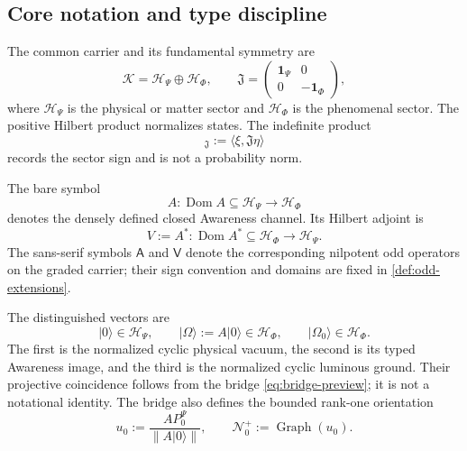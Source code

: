 \documentclass[11pt,reqno]{scrartcl}
\newcommand{\scrK}{\mathscr K}
\newcommand{\scrHP}{\mathscr H_{\Psi}}
\newcommand{\scrHF}{\mathscr H_{\Phi}}
\newcommand{\fundJ}{\mathfrak J}
\newcommand{\idop}{\mathbf 1}
\newcommand{\Aodd}{\mathsf A}
\newcommand{\Vodd}{\mathsf V}
\newcommand{\ket}[1]{\lvert #1\rangle}
\newcommand{\inner}[2]{\langle #1,#2\rangle}
\newcommand{\kInner}[2]{[#1,#2]_{\fundJ}}
\DeclareMathOperator{\Dom}{Dom}
\DeclareMathOperator{\Graph}{Graph}
\theoremstyle{plain}
\theoremstyle{definition}
\theoremstyle{remark}
\begin{document}
\subsection{Core notation and type discipline}

The common carrier and its fundamental symmetry are
\begin{equation}
  \scrK=\scrHP\oplus\scrHF,
  \qquad
  \fundJ=\begin{pmatrix}\idop_{\Psi}&0\\0&-\idop_{\Phi}\end{pmatrix},
  \label{eq:carrier-charter}
\end{equation}
where \(\scrHP\) is the physical or matter sector and \(\scrHF\) is the
phenomenal sector.  The positive Hilbert product normalizes states.  The
indefinite product
\begin{equation}
  \kInner{\xi}{\eta}:=\inner{\xi}{\fundJ\eta}
\end{equation}
records the sector sign and is not a probability norm.

The bare symbol
\begin{equation}
  A:\Dom A\subseteq\scrHP\longrightarrow\scrHF
  \label{eq:typed-A-charter}
\end{equation}
denotes the densely defined closed Awareness channel.  Its Hilbert adjoint is
\begin{equation}
  V:=A^*:\Dom A^*\subseteq\scrHF\longrightarrow\scrHP.
  \label{eq:typed-V-charter}
\end{equation}
The sans-serif symbols \(\Aodd\) and \(\Vodd\) denote the corresponding
nilpotent odd operators on the graded carrier; their sign convention and
domains are fixed in \cref{def:odd-extensions}.

The distinguished vectors are
\begin{equation}
  \ket0\in\scrHP,
  \qquad
  \ket\Omega:=A\ket0\in\scrHF,
  \qquad
  \ket{\Omega_0}\in\scrHF.
  \label{eq:ground-charter}
\end{equation}
The first is the normalized cyclic physical vacuum, the second is its typed
Awareness image, and the third is the normalized cyclic luminous ground.
Their projective coincidence follows from the bridge
\eqref{eq:bridge-preview}; it is not a notational identity.  The bridge also
defines the bounded rank-one orientation
\begin{equation}
  u_0:=\frac{A P_0^{\Psi}}{\|A\ket0\|},
  \qquad
  \mathscr N_0^+:=\Graph(u_0).
\end{equation}
\end{document}
